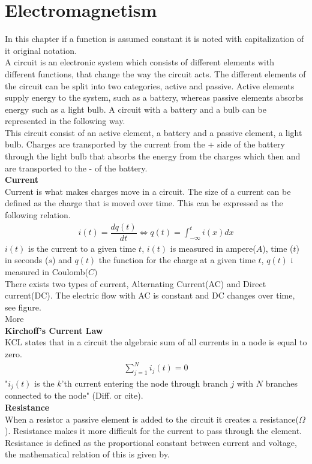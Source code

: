 \chapter{Electromagnetism}
In this chapter if a function is assumed constant it is noted with capitalization of it original notation. 
\\ 
A circuit is an electronic system which consists of different elements with different functions, that change the way the circuit acts. The different elements of the circuit can be split into two categories, active and passive. Active elements supply energy to the system, such as a battery, whereas passive elements absorbs energy such as a light bulb. A circuit with a battery and a bulb can be represented in the following way.
\\
This circuit consist of an active element, a battery and a passive element, a light bulb. Charges are transported by the current from the + side of the battery through the light bulb that absorbs the energy from the charges which then and are transported to the - of the battery.
\\
\textbf{Current}
\\
Current is what makes charges move in a circuit. The size of a current can be defined as the charge that is moved over time. This can be expressed as the following relation.
\begin{align}
i(t)=\dfrac{dq(t)}{dt} \Leftrightarrow q(t)=\int_{-\infty}^{t}i(x)dx
\end{align}
$i(t)$ is the current to a given time $t$, $i(t)$ is measured in ampere($A$), time ($t$) in seconds ($s$) and $q(t)$ the function for the charge at a given time $t$, $q(t)$ i measured in Coulomb($C)$
\\
There exists two types of current, Alternating Current(AC) and Direct current(DC). The electric flow with AC is constant and DC changes over time, see figure.
\\
More
\\
\textbf{Kirchoff's Current Law}
\\
KCL states that in a circuit the algebraic sum of all currents in a node is equal to zero.
\begin{align}
\sum_{j=1}^{N} i_{j}(t) = 0
\end{align}
"$i_{j}(t)$ is the $k$'th current entering the node through branch $j$  with $N$ branches connected to the node" (Diff. or cite).
\\
\textbf{Resistance}
\\
When a resistor a passive element is added to the circuit it creates a resistance($\Omega$). Resistance makes it more difficult for the current to pass through the element. Resistance is defined as the proportional constant between current and voltage, the mathematical relation of this is given by.

